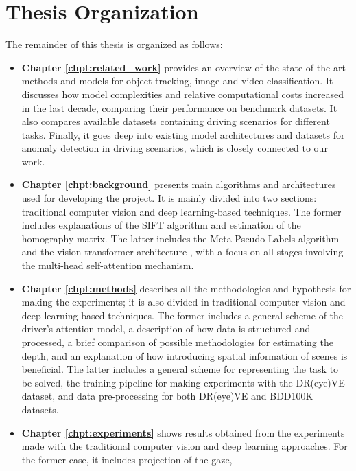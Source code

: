 \section{Thesis Organization}
\label{sec:organization}
The remainder of this thesis is organized as follows: 
\begin{itemize}
    \item \textbf{Chapter \ref{chpt:related_work}} provides an overview of the 
    state-of-the-art methods and models for object tracking, image and video 
    classification. It discusses how model complexities and relative computational 
    costs increased in the last decade, comparing their performance on benchmark 
    datasets. It also compares available datasets containing driving scenarios 
    for different tasks. Finally, it goes deep into existing model architectures 
    and datasets for anomaly detection in driving scenarios, which is closely 
    connected to our work.
    \item \textbf{Chapter \ref{chpt:background}} presents main algorithms and 
    architectures used for developing the project. It is mainly divided into 
    two sections: traditional computer vision and deep learning-based techniques.
    The former includes explanations of the SIFT algorithm \cite{lowe_sift} and 
    estimation of the homography matrix. The latter includes the Meta Pseudo-Labels 
    algorithm \cite{pham2021meta} and the vision transformer architecture \cite{vit},
    with a focus on all stages involving the multi-head self-attention mechanism.
    \item \textbf{Chapter \ref{chpt:methods}} describes all the methodologies 
    and hypothesis for making the experiments; it is also divided in traditional 
    computer vision and deep learning-based techniques.
    The former includes a general scheme of the driver's attention model, 
    a description of how data is structured and processed, a brief comparison of 
    possible methodologies for estimating the depth, and an explanation of how 
    introducing spatial information of scenes is beneficial.
    The latter includes a general scheme for representing the task to be solved, 
    the training pipeline for making experiments with the DR(eye)VE dataset, and 
    data pre-processing for both DR(eye)VE \cite{dreyeve} and BDD100K 
    \cite{bdd100k} datasets. 
    \item \textbf{Chapter \ref{chpt:experiments}} shows results obtained from 
    the experiments made with the traditional computer vision and deep learning 
    approaches. For the former case, it includes projection of the gaze, 

\end{itemize}
